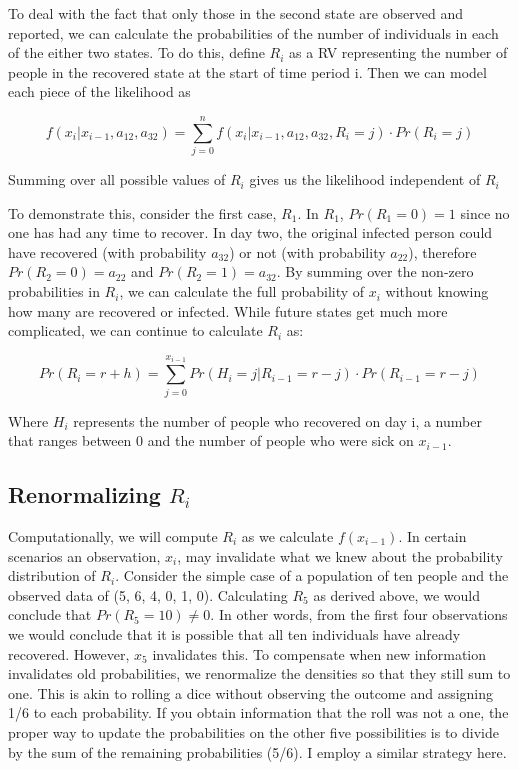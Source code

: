 \documentclass{svproc}
\begin{document}
To deal with the fact that only those in the second state are observed and reported, we can calculate the probabilities of the number of individuals in each of the either two states. To do this, define $R_i$ as a RV representing the number of people in the recovered state at the start of time period i. Then we can model each piece of the likelihood as

\begin{equation}
f(x_i | x_{i-1}, a_{12}, a_{32}) =\sum_{j=0}^n f(x_i | x_{i-1}, a_{12}, a_{32}, R_i=j)\cdot Pr(R_i=j) 
\label{sum}
\end{equation}

Summing over all possible values of $R_i$ gives us the likelihood independent of $R_i$

To demonstrate this, consider the first case, $R_1$. In $R_1$, $Pr(R_1=0)=1$ since no one has had any time to recover. In day two, the original infected person could have recovered (with probability $a_{32}$) or not (with probability $a_{22}$), therefore $Pr(R_2=0) = a_{22}$ and $Pr(R_2=1)=a_{32}$. By summing over the non-zero probabilities in $R_i$, we can calculate the full probability of $x_i$ without knowing how many are recovered or infected. While future states get much more complicated, we can continue to calculate $R_i$ as:

\begin{equation}
Pr(R_i = r + h) = \sum_{j=0}^{x_{i-1}} Pr(H_i=j|R_{i-1}=r-j)\cdot Pr(R_{i-1}=r-j)
\end{equation}

Where $H_i$ represents the number of people who recovered on day i, a number that ranges between 0 and the number of people who were sick on $x_{i-1}$.

\subsection*{Renormalizing $R_i$}
Computationally, we will compute 
$R_i$ as we calculate $f(x_{i-1})$. In certain scenarios an observation, $x_i$, may invalidate what we knew about the probability distribution of $R_i$. Consider the simple case of a population of ten people and the observed data of (5, 6, 4, 0, 1, 0). Calculating $R_5$ as derived above, we would conclude that $Pr(R_5 =10)\neq 0$. In other words, from the first four observations we would conclude that it is possible that all ten individuals have already recovered. However, $x_5$ invalidates this. To compensate when new information invalidates old  probabilities, we renormalize the densities so that they still sum to one. This is akin to rolling a dice without observing the outcome and assigning 1/6 to each probability. If you obtain information that the roll was not a one, the proper way to update the probabilities on the other five possibilities is to divide by the sum of the remaining probabilities (5/6). I employ a similar strategy here.
\end{document}
